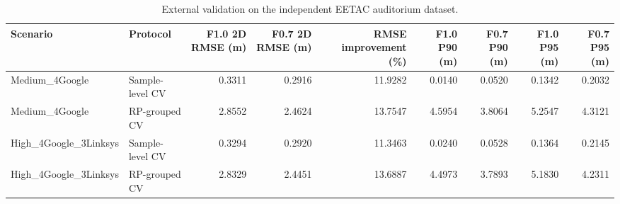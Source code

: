 \begin{table}
\caption{External validation on the independent EETAC auditorium dataset.}
\label{tab:eetac_external}
\begin{tabular}{llrrrrrrr}
\toprule
Scenario & Protocol & F1.0 2D RMSE (m) & F0.7 2D RMSE (m) & RMSE improvement (\%) & F1.0 P90 (m) & F0.7 P90 (m) & F1.0 P95 (m) & F0.7 P95 (m) \\
\midrule
Medium\_4Google & Sample-level CV & 0.3311 & 0.2916 & 11.9282 & 0.0140 & 0.0520 & 0.1342 & 0.2032 \\
Medium\_4Google & RP-grouped CV & 2.8552 & 2.4624 & 13.7547 & 4.5954 & 3.8064 & 5.2547 & 4.3121 \\
High\_4Google\_3Linksys & Sample-level CV & 0.3294 & 0.2920 & 11.3463 & 0.0240 & 0.0528 & 0.1364 & 0.2145 \\
High\_4Google\_3Linksys & RP-grouped CV & 2.8329 & 2.4451 & 13.6887 & 4.4973 & 3.7893 & 5.1830 & 4.2311 \\
\bottomrule
\end{tabular}
\end{table}
